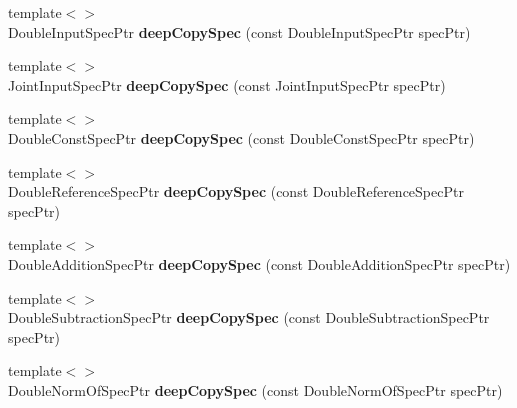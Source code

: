 \begin{DoxyCompactItemize}
\item 
\hypertarget{namespacegiskard__suturo_a10b3d957a259605b2b0de3eced5e26ef}{{\footnotesize template$<$$>$ }\\Double\-Input\-Spec\-Ptr {\bfseries deep\-Copy\-Spec} (const Double\-Input\-Spec\-Ptr spec\-Ptr)}\label{namespacegiskard__suturo_a10b3d957a259605b2b0de3eced5e26ef}

\item 
\hypertarget{namespacegiskard__suturo_a5cbe4b530ba08c2e760bc148e7b5e5ea}{{\footnotesize template$<$$>$ }\\Joint\-Input\-Spec\-Ptr {\bfseries deep\-Copy\-Spec} (const Joint\-Input\-Spec\-Ptr spec\-Ptr)}\label{namespacegiskard__suturo_a5cbe4b530ba08c2e760bc148e7b5e5ea}

\item 
\hypertarget{namespacegiskard__suturo_ace4c7f410cb11b2a7851ea2e72dad021}{{\footnotesize template$<$$>$ }\\Double\-Const\-Spec\-Ptr {\bfseries deep\-Copy\-Spec} (const Double\-Const\-Spec\-Ptr spec\-Ptr)}\label{namespacegiskard__suturo_ace4c7f410cb11b2a7851ea2e72dad021}

\item 
\hypertarget{namespacegiskard__suturo_a16ee2333376a9d2bdf0dd045a5858f1c}{{\footnotesize template$<$$>$ }\\Double\-Reference\-Spec\-Ptr {\bfseries deep\-Copy\-Spec} (const Double\-Reference\-Spec\-Ptr spec\-Ptr)}\label{namespacegiskard__suturo_a16ee2333376a9d2bdf0dd045a5858f1c}

\item 
\hypertarget{namespacegiskard__suturo_adf4a73442d6a08d1081a8db9e8be71a5}{{\footnotesize template$<$$>$ }\\Double\-Addition\-Spec\-Ptr {\bfseries deep\-Copy\-Spec} (const Double\-Addition\-Spec\-Ptr spec\-Ptr)}\label{namespacegiskard__suturo_adf4a73442d6a08d1081a8db9e8be71a5}

\item 
\hypertarget{namespacegiskard__suturo_a70f018831a6260d32feb866b17db7ceb}{{\footnotesize template$<$$>$ }\\Double\-Subtraction\-Spec\-Ptr {\bfseries deep\-Copy\-Spec} (const Double\-Subtraction\-Spec\-Ptr spec\-Ptr)}\label{namespacegiskard__suturo_a70f018831a6260d32feb866b17db7ceb}

\item 
\hypertarget{namespacegiskard__suturo_a55739ddac526723847a4212561053292}{{\footnotesize template$<$$>$ }\\Double\-Norm\-Of\-Spec\-Ptr {\bfseries deep\-Copy\-Spec} (const Double\-Norm\-Of\-Spec\-Ptr spec\-Ptr)}\label{namespacegiskard__suturo_a55739ddac526723847a4212561053292}


\end{DoxyCompactItemize}
